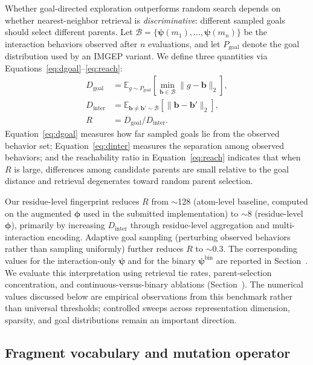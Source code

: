 \documentclass[journal=jcisd8,manuscript=article]{achemso}
\begin{document}
Whether goal-directed exploration outperforms random search depends on whether nearest-neighbor retrieval is \emph{discriminative}: different sampled goals should select different parents. Let $\mathcal{B} = \{\boldsymbol{\psi}(m_1), \ldots, \boldsymbol{\psi}(m_n)\}$ be the interaction behaviors observed after $n$ evaluations, and let $P_\mathrm{goal}$ denote the goal distribution used by an IMGEP variant. We define three quantities via Equations~\ref{eq:dgoal}--\ref{eq:reach}:
\begin{align}
    D_\text{goal} &= \mathbb{E}_{g \sim P_\text{goal}}\left[\min_{\boldsymbol{b} \in \mathcal{B}} \|g - \boldsymbol{b}\|_2\right],  \label{eq:dgoal} \\
    D_\text{inter} &= \mathbb{E}_{\boldsymbol{b} \neq \boldsymbol{b}' \sim \mathcal{B}}\left[\|\boldsymbol{b} - \boldsymbol{b}'\|_2\right], \label{eq:dinter} \\
    R &= D_\text{goal} / D_\text{inter}. \label{eq:reach}
\end{align}
Equation~\ref{eq:dgoal} measures how far sampled goals lie from the observed behavior set; Equation~\ref{eq:dinter} measures the separation among observed behaviors; and the reachability ratio in Equation~\ref{eq:reach} indicates that when $R$ is large, differences among candidate parents are small relative to the goal distance and retrieval degenerates toward random parent selection.

Our residue-level fingerprint reduces $R$ from $\sim$128 (atom-level baseline, computed on the augmented $\boldsymbol{\phi}$ used in the submitted implementation) to $\sim$8 (residue-level $\boldsymbol{\phi}$), primarily by increasing $D_\text{inter}$ through residue-level aggregation and multi-interaction encoding. Adaptive goal sampling (perturbing observed behaviors rather than sampling uniformly) further reduces $R$ to $\sim$0.3. The corresponding values for the interaction-only $\boldsymbol{\psi}$ and for the binary $\boldsymbol{\psi}^{\mathrm{bin}}$ are reported in Section~. We evaluate this interpretation using retrieval tie rates, parent-selection concentration, and continuous-versus-binary ablations (Section~). The numerical values discussed below are empirical observations from this benchmark rather than universal thresholds; controlled sweeps across representation dimension, sparsity, and goal distributions remain an important direction.

\subsection{Fragment vocabulary and mutation operator}
\label{sec:crem}
\end{document}
